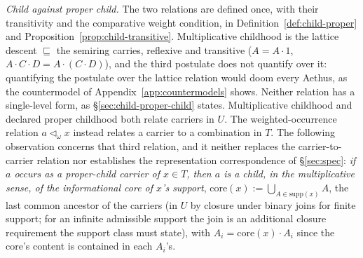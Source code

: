 
\textit{Child against proper child.} The two relations are defined once, with their transitivity and the comparative weight condition, in Definition~\ref{def:child-proper} and Proposition~\ref{prop:child-transitive}. Multiplicative childhood is the lattice descent $\sqsubseteq$ the semiring carries, reflexive and transitive ($A = A \cdot 1$, $A \cdot C \cdot D = A \cdot (C \cdot D)$), and the third postulate does not quantify over it: quantifying the postulate over the lattice relation would doom every Aethus, as the countermodel of Appendix~\ref{app:countermodels} shows. Neither relation has a single-level form, as \S\ref{sec:child-proper-child} states. Multiplicative childhood and declared proper childhood both relate carriers in $U$. The weighted-occurrence relation $a \lhd_\omega x$ instead relates a carrier to a combination in $T$. The following observation concerns that third relation, and it neither replaces the carrier-to-carrier relation nor establishes the representation correspondence of \S\ref{sec:spec}: \emph{if $a$ occurs as a proper-child carrier of $x \in T$, then $a$ is a child, in the multiplicative sense, of the informational core of $x$'s support}, $\mathrm{core}(x) := \bigcup_{A \in \mathrm{supp}(x)} A$, the last common ancestor of the carriers (in $U$ by closure under binary joins for finite support; for an infinite admissible support the join is an additional closure requirement the support class must state), with $A_i = \mathrm{core}(x) \cdot A_i$ since the core's content is contained in each $A_i$'s.


